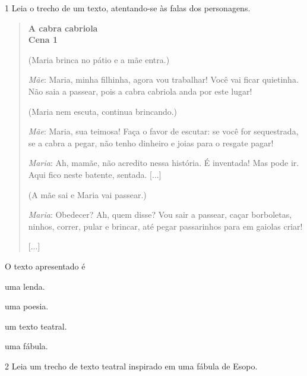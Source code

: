 \num{1} Leia o trecho de um texto, atentando-se às falas dos personagens.

\begin{quote}
\textbf{A cabra cabriola}\\
\textbf{Cena 1}

(Maria brinca no pátio e a mãe entra.)

\emph{Mãe}: Maria, minha filhinha, agora vou trabalhar! Você vai ficar
quietinha. Não saia a passear, pois a cabra cabriola anda por este
lugar!

(Maria nem escuta, continua brincando.)

\emph{Mãe}: Maria, sua teimosa! Faça o favor de escutar: se você for
sequestrada, se a cabra a pegar, não tenho dinheiro e joias para o
resgate pagar!

\emph{Maria}: Ah, mamãe, não acredito nessa história. É inventada! Mas
pode ir. Aqui fico neste batente, sentada. {[}...{]}

(A mãe sai e Maria vai passear.)

\emph{Maria}: Obedecer? Ah, quem disse? Vou sair a passear, caçar
borboletas, ninhos, correr, pular e brincar, até pegar passarinhos para
em gaiolas criar!

{[}...{]}

\end{quote}

O texto apresentado é

\begin{escolha}
\item uma lenda.

\item uma poesia.

\item um texto teatral.

\item uma fábula.
\end{escolha}



\num{2} Leia um trecho de texto teatral inspirado em uma fábula de Esopo.

